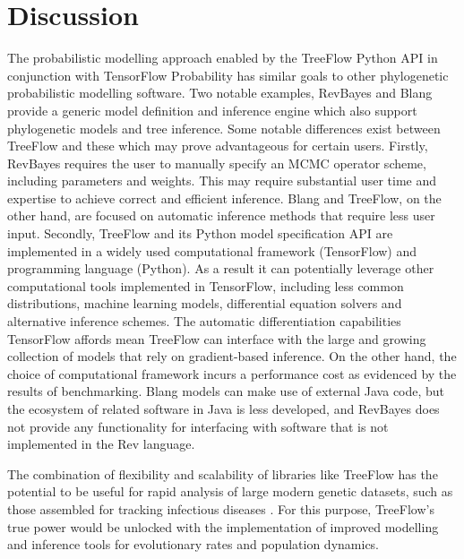 \documentclass[oupdraft]{sysbio_sse}
\let\cite\citep
\providecommand{\DIFaddend}{} %
\begin{document}
\DIFaddend \section{Discussion}

The probabilistic modelling approach enabled by the TreeFlow Python API in conjunction with TensorFlow Probability has similar goals to other phylogenetic probabilistic modelling software. Two notable examples, RevBayes \cite{hohna2016revbayes} and Blang \cite{bouchard2022blang} provide a generic model definition and inference engine which also support phylogenetic models and tree inference. Some notable differences exist between TreeFlow and these which may prove advantageous for certain users. Firstly, RevBayes requires the user to manually specify an MCMC operator scheme, including parameters and weights. This may require substantial user time and expertise to achieve correct and efficient inference. Blang and TreeFlow, on the other hand, are focused on automatic inference methods that require less user input. Secondly, TreeFlow and its Python model specification API are implemented in a widely used computational framework (TensorFlow) and programming language (Python). As a result it can potentially leverage other computational tools implemented in TensorFlow, including less common distributions, machine learning models, differential equation solvers and alternative inference schemes. The automatic differentiation capabilities TensorFlow affords mean TreeFlow can interface with the large and growing collection of models that rely on gradient-based inference. On the other hand, the choice of computational framework incurs a performance cost as evidenced by the results of benchmarking. Blang models can make use of external Java code, but the ecosystem of related software in Java is less developed, and RevBayes does not provide any functionality for interfacing with software that is not implemented in the Rev language.

The combination of flexibility and scalability of libraries like TreeFlow has the potential to be useful for rapid analysis of large modern genetic datasets, such as those assembled for tracking infectious diseases \cite{hadfield2018nextstrain}. For this purpose, TreeFlow's true power would be unlocked with the implementation of improved modelling and inference tools for evolutionary rates and population dynamics.
\end{document}
